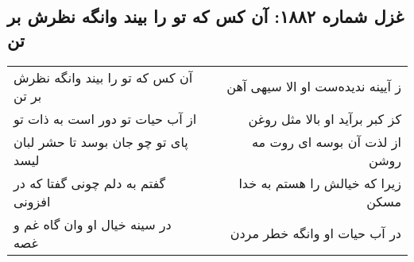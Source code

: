 \begin{center}
\section*{غزل شماره ۱۸۸۲: آن کس که تو را بیند وانگه نظرش بر تن}
\label{sec:1882}
\begin{longtable}{l p{0.5cm} r}
آن کس که تو را بیند وانگه نظرش بر تن
&&
ز آیینه ندیده‌ست او الا سیهی آهن
\\
از آب حیات تو دور است به ذات تو
&&
کز کبر برآید او بالا مثل روغن
\\
پای تو چو جان بوسد تا حشر لبان لیسد
&&
از لذت آن بوسه ای روت مه روشن
\\
گفتم به دلم چونی گفتا که در افزونی
&&
زیرا که خیالش را هستم به خدا مسکن
\\
در سینه خیال او وان گاه غم و غصه
&&
در آب حیات او وانگه خطر مردن
\\
\end{longtable}
\end{center}

